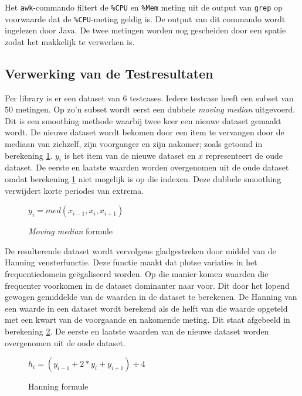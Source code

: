 Het \verb+awk+-commando filtert de \verb+%CPU+ en \verb+%Mem+ meting uit de output van \verb+grep+ op voorwaarde dat de \verb+%CPU+-meting geldig is. De output van dit commando wordt ingelezen door Java. De twee metingen worden nog gescheiden door een spatie zodat het makkelijk te verwerken is.

\subsection{Verwerking van de Testresultaten}
\label{sec:methodologie:verwerking}

Per library is er een dataset van 6 testcases. Iedere testcase heeft een subset van 50 metingen. Op zo'n subset wordt eerst een dubbele \textit{moving median} uitgevoerd. \autocite{mediansmoothing} Dit is een smoothing methode waarbij twee keer een nieuwe dataset gemaakt wordt. De nieuwe dataset wordt bekomen door een item te vervangen door de mediaan van zichzelf, zijn voorganger en zijn nakomer; zoals getoond in berekening \ref{math:mediansmooth}. $y_{i}$ is het item van de nieuwe dataset en $x$ representeert de oude dataset. De eerste en laatste waarden worden overgenomen uit de oude dataset omdat berekening \ref{math:mediansmooth} niet mogelijk is op die indexen. Deze dubbele smoothing verwijdert korte periodes van extrema.

\begin{figure}
\centering
$y_{i} = med(x_{i-1}, x_{i}, x_{i+1})$
\caption{\textit{Moving median} formule}
\label{math:mediansmooth}
\end{figure}

De resulterende dataset wordt vervolgens gladgestreken door middel van de Hanning vensterfunctie. Deze functie maakt dat plotse variaties in het frequentiedomein geëgaliseerd worden. Op die manier komen waarden die frequenter voorkomen in de dataset dominanter naar voor. Dit door het lopend gewogen gemiddelde van de waarden in de dataset te berekenen. De Hanning van een waarde in een dataset wordt berekend als de helft van die waarde opgeteld met een kwart van de voorgaande en nakomende meting. Dit staat afgebeeld in berekening \ref{math:hanningformule}. De eerste en laatste waarden van de nieuwe dataset worden overgenomen uit de oude dataset. \autocite{hanning}

\begin{figure}
\centering
$h_{i} = (y_{i-1} + 2 \ast y_{i} + y_{i+1}) \div 4$
\caption{Hanning formule}
\label{math:hanningformule}
\end{figure}

